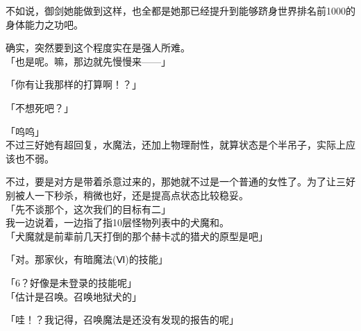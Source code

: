 不如说，御剑她能做到这样，也全都是她那已经提升到能够跻身世界排名前1000的身体能力之功吧。

确实，突然要到这个程度实在是强人所难。\\

「也是呢。嘛，那边就先慢慢来——」

「你有让我那样的打算啊！？」

「不想死吧？」

「呜呜」\\

不过三好她有超回复，水魔法，还加上物理耐性，就算状态是个半吊子，实际上应该也不弱。

不过，要是对方是带着杀意过来的，那她就不过是一个普通的女性了。为了让三好别被人一下秒杀，稍微也好，还是提高点状态比较稳妥。\\

「先不谈那个，这次我们的目标有二」\\

我一边说着，一边指了指10层怪物列表中的犬魔和。\\

「犬魔就是前辈前几天打倒的那个赫卡忒的猎犬的原型是吧」

「对。那家伙，有暗魔法(Ⅵ)的技能」

「6？好像是未登录的技能呢」\\

「估计是召唤。召唤地狱犬的」

「哇！？我记得，召唤魔法是还没有发现的报告的呢」

